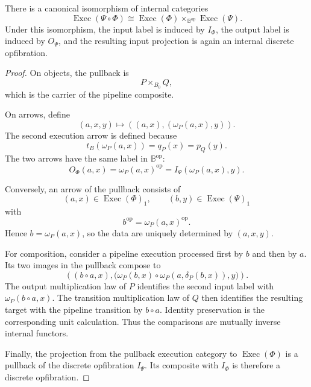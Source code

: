 \begin{theorem}
\label{thm:execution-pipeline-pullback}
There is a canonical isomorphism of internal categories
\[
    \operatorname{Exec}(\Psi\circ\Phi)
    \cong
    \operatorname{Exec}(\Phi)
    \times_{\mathbb B^{\mathrm{op}}}
    \operatorname{Exec}(\Psi).
\]
Under this isomorphism, the input label is induced by \(I_\Phi\), the
output label is induced by \(O_\Psi\), and the resulting input projection
is again an internal discrete opfibration.
\end{theorem}

\begin{proof}
On objects, the pullback is
\[
    P\times_{B_0}Q,
\]
which is the carrier of the pipeline composite.

On arrows, define
\[
    (a,x,y)
    \longmapsto
    \left(
        (a,x),
        (\omega_P(a,x),y)
    \right).
\]
The second execution arrow is defined because
\[
    t_B(\omega_P(a,x))
    =
    q_P(x)
    =
    p_Q(y).
\]
The two arrows have the same label in
\(\mathbb B^{\mathrm{op}}\):
\[
    O_\Phi(a,x)
    =
    \omega_P(a,x)^{\mathrm{op}}
    =
    I_\Psi(\omega_P(a,x),y).
\]

Conversely, an arrow of the pullback consists of
\[
    (a,x)\in\operatorname{Exec}(\Phi)_1,
    \qquad
    (b,y)\in\operatorname{Exec}(\Psi)_1
\]
with
\[
    b^{\mathrm{op}}
    =
    \omega_P(a,x)^{\mathrm{op}}.
\]
Hence \(b=\omega_P(a,x)\), so the data are uniquely determined by
\((a,x,y)\).

For composition, consider a pipeline execution processed first by \(b\) and
then by \(a\). Its two images in the pullback compose to
\[
    \left(
        (b\circ a,x),
        \bigl(
            \omega_P(b,x)
            \circ
            \omega_P(a,\delta_P(b,x)),
            y
        \bigr)
    \right).
\]
The output multiplication law of \(P\) identifies the second input label
with \(\omega_P(b\circ a,x)\). The transition multiplication law of \(Q\)
then identifies the resulting target with the pipeline transition by
\(b\circ a\). Identity preservation is the corresponding unit calculation.
Thus the comparisons are mutually inverse internal functors.

Finally, the projection from the pullback execution category to
\(\operatorname{Exec}(\Phi)\) is a pullback of the discrete opfibration
\(I_\Psi\). Its composite with \(I_\Phi\) is therefore a discrete
opfibration.
\end{proof}

